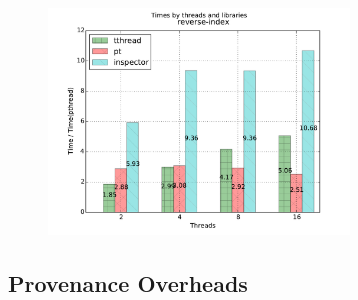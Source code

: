 \begin{figure}[h]
\includegraphics[width=8cm]{figure/reverse-index.pdf}
\end{figure}

%

\subsection{Provenance Overheads}



